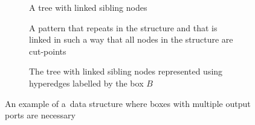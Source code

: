 \begin{figure}[t]
\begin{center}

  \begin{subfigure}[b]{0.36\linewidth}
  \begin{center}
  
  \end{center}
  \caption{A tree with linked sibling nodes}
  \label{fig:hyper_a}
  \end{subfigure}
  \hfill
  \begin{subfigure}[b]{0.24\linewidth}
  \begin{center}
  
  \vspace{-2mm}
  \end{center}
  \caption{A pattern that repeats in the structure and that is linked in such a
    way that all nodes in the structure are cut-points}
  \label{fig:hyper_b}
  \end{subfigure}
  \hfill
  \begin{subfigure}[b]{0.35\linewidth}
  \begin{center}
  
  \end{center}
  \caption{The tree with linked sibling nodes represented using
    hyperedges labelled by the box $B$}
  \label{fig:hyper_c}
  \end{subfigure}


  \caption{An example of a~data structure where boxes with multiple output ports
  are necessary}

  \label{figLinkedBrothers}

\end{center}
\end{figure}

